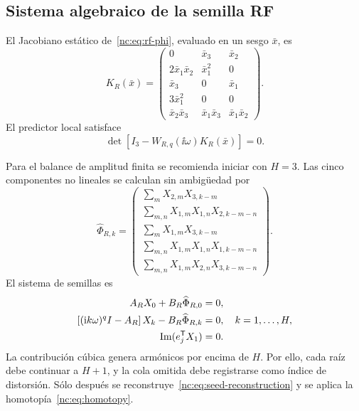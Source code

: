 \subsection{Sistema algebraico de la semilla RF}

El Jacobiano estático de~\eqref{nc:eq:rf-phi}, evaluado en un sesgo \(\bar x\), es
\begin{equation}
 K_R(\bar x)=
 \begin{pmatrix}
 0&\bar x_3&\bar x_2\\
 2\bar x_1\bar x_2&\bar x_1^2&0\\
 \bar x_3&0&\bar x_1\\
 3\bar x_1^2&0&0\\
 \bar x_2\bar x_3&\bar x_1\bar x_3&\bar x_1\bar x_2
 \end{pmatrix}.
 \label{nc:eq:rf-k}
\end{equation}
El predictor local satisface
\begin{equation}
 \det\left[I_3-W_{R,q}(\ii\omega)K_R(\bar x)\right]=0.
 \label{nc:eq:rf-local-closure}
\end{equation}

Para el balance de amplitud finita se recomienda iniciar con \(H=3\). Las cinco
componentes no lineales se calculan sin ambigüedad por
\begin{equation}
 \widehat\Phi_{R,k}=
 \begin{pmatrix}
 \displaystyle\sum_m X_{2,m}X_{3,k-m}\\[5pt]
 \displaystyle\sum_{m,n}X_{1,m}X_{1,n}X_{2,k-m-n}\\[5pt]
 \displaystyle\sum_m X_{1,m}X_{3,k-m}\\[5pt]
 \displaystyle\sum_{m,n}X_{1,m}X_{1,n}X_{1,k-m-n}\\[5pt]
 \displaystyle\sum_{m,n}X_{1,m}X_{2,n}X_{3,k-m-n}
 \end{pmatrix}.
 \label{nc:eq:rf-fourier-phi}
\end{equation}
El sistema de semillas es
\begin{align}
 A_RX_0+B_R\widehat\Phi_{R,0}&=0,\\
 \left[(\mathrm{i} k\omega)^qI-A_R\right]X_k
 -B_R\widehat\Phi_{R,k}&=0,
 \quad k=1,\ldots,H,\\
 \operatorname{Im}(e_j^{\mathsf T} X_1)&=0.
 \label{nc:eq:rf-hb-system}
\end{align}
La contribución cúbica genera armónicos por encima de \(H\). Por ello, cada raíz
debe continuar a \(H+1\), y la cola omitida debe registrarse como índice de
distorsión. Sólo después se reconstruye~\eqref{nc:eq:seed-reconstruction} y se
aplica la homotopía~\eqref{nc:eq:homotopy}.


